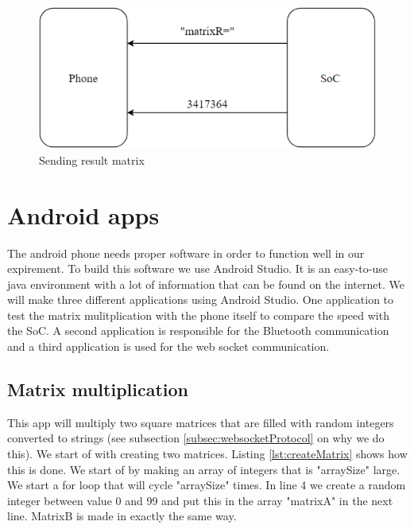 \documentclass[a4paper, 11pt]{report}
\begin{document}
\begin{figure}[ht]
\centering
\includegraphics[scale=0.7]{images/webSocketCom2.pdf}
\caption{Sending result matrix}\label{fig:ResultMatrix}
\end{figure}

\section{Android apps}\label{sec:AndroidApps}
The android phone needs proper software in order to function well in our expirement. To build this software we use Android Studio. It is an easy-to-use java environment with a lot of information that can be found on the internet. We will make three different applications using Android Studio. One application to test the matrix mulitplication with the phone itself to compare the speed with the SoC. A second application is responsible for the Bluetooth communication and a third application is used for the web socket communication.

	\subsection{Matrix multiplication}
This app will multiply two square matrices that are filled with random integers converted to strings (see subsection \ref{subsec:websocketProtocol} on why we do this). We start of with creating two matrices. Listing \ref{lst:createMatrix} shows how this is done. We start of by making an array of integers that is "arraySize" large. We start a for loop that will cycle "arraySize" times. In line 4 we create a random integer between value 0 and 99 and put this in the array "matrixA" in the next line. MatrixB is made in exactly the same way.
\end{document}
